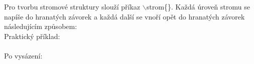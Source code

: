 \documentclass[a4paper, 12pt]{report}
\begin{document}
	Pro tvorbu stromové struktury slouží příkaz $\backslash$strom\{\}. Každá úroveň stromu se napíše do hranatých závorek a každá další se vnoří opět do hranatých závorek následujícím způsobem:\\
	Praktický příklad: \\
	\\[1cm]
	Po vysázení:\\[5mm]
	
\end{document}
